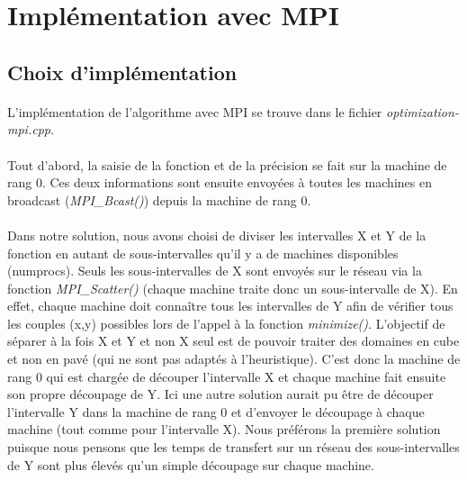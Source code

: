 \section{Implémentation avec MPI}
\label{sec:mpi}

\subsection{Choix d'implémentation}

    \paragraph{}
    L'implémentation de l'algorithme avec MPI se trouve dans le fichier \textit{optimization-mpi.cpp}. 
    
    \paragraph{}
    Tout d'abord, la saisie de la fonction et de la précision se fait sur la machine de rang 0. Ces deux informations sont ensuite envoyées à toutes les machines en broadcast (\textit{MPI\_Bcast()}) depuis la machine de rang 0.
    
    \paragraph{}
    Dans notre solution, nous avons choisi de diviser les intervalles X et Y de la fonction en autant de sous-intervalles qu'il y a de machines disponibles (numprocs). Seuls les sous-intervalles de X sont envoyés sur le réseau via la fonction \textit{MPI\_Scatter()} (chaque machine traite donc un sous-intervalle de X). En effet, chaque machine doit connaître tous les intervalles de Y afin de vérifier tous les couples (x,y) possibles lors de l'appel à la fonction \textit{minimize()}. L'objectif de séparer à la fois X et Y et non X seul est de pouvoir traiter des domaines en cube et non en pavé (qui ne sont pas adaptés à l'heuristique). C'est donc la machine de rang 0 qui est chargée de découper l'intervalle X et chaque machine fait ensuite son propre découpage de Y. Ici une autre solution aurait pu être de découper l'intervalle Y dans la machine de rang 0 et d'envoyer le découpage à chaque machine (tout comme pour l'intervalle X). Nous préférons la première solution puisque nous pensons que les temps de transfert sur un réseau des sous-intervalles de Y sont plus élevés qu'un simple découpage sur chaque machine.
    
